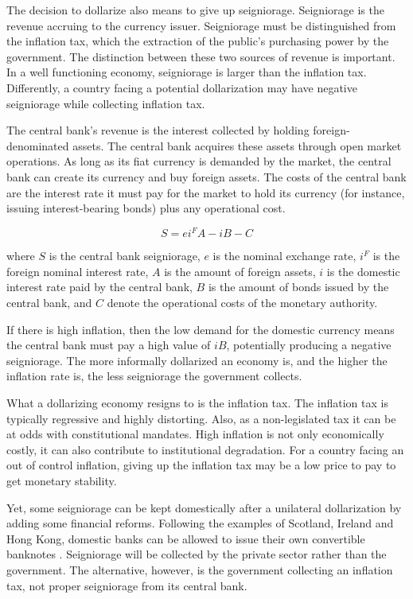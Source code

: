 \documentclass[12pt]{article}
\begin{document}
The decision to dollarize also means to give up seigniorage. Seigniorage is the revenue accruing to the currency issuer. Seigniorage must be distinguished from the inflation tax, which the extraction of the public's purchasing power by the government. The distinction between these two sources of revenue is important. In a well functioning economy, seigniorage is larger than the inflation tax. Differently, a country facing a potential dollarization may have negative seigniorage while collecting inflation tax.

The central bank's revenue is the interest collected by holding foreign-denominated assets. The central bank acquires these assets through open market operations. As long as its fiat currency is demanded by the market, the central bank can create its currency and buy foreign assets. The costs of the central bank are the interest rate it must pay for the market to hold its currency (for instance, issuing interest-bearing bonds) plus any operational cost.

\begin{equation}\label{Eq:2}
    S = ei^FA - iB - C
\end{equation}

where $S$ is the central bank seigniorage, $e$ is the nominal exchange rate, $i^F$ is the foreign nominal interest rate, $A$ is the amount of foreign assets, $i$ is the domestic interest rate paid by the central bank, $B$ is the amount of bonds issued by the central bank, and $C$ denote the operational costs of the monetary authority.

If there is high inflation, then the low demand for the domestic currency means the central bank must pay a high value of $iB$, potentially producing a negative seigniorage. The more informally dollarized an economy is, and the higher the inflation rate is, the less seigniorage the government collects.

What a dollarizing economy resigns to is the inflation tax. The inflation tax is typically regressive and highly distorting. Also, as a non-legislated tax it can be at odds with constitutional mandates. High inflation is not only economically costly, it can also contribute to institutional degradation. For a country facing an out of control inflation, giving up the inflation tax may be a low price to pay to get monetary stability.

Yet, some seigniorage can be kept domestically after a unilateral dollarization by adding some financial reforms. Following the examples of Scotland, Ireland and Hong Kong, domestic banks can be allowed to issue their own convertible banknotes \parencite[see][]{Hogan2012}. Seigniorage will be collected by the private sector rather than the government. The alternative, however, is the government collecting an inflation tax, not proper seigniorage from its central bank.
\end{document}
